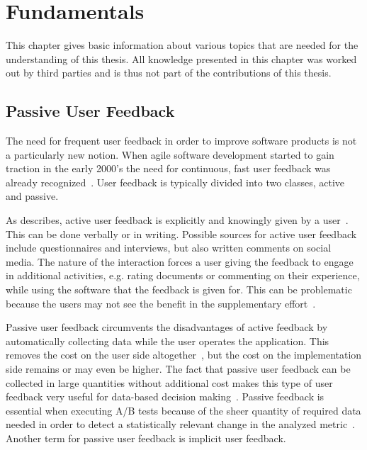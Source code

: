 %
\chapter{Fundamentals}
\label{ch:fundamentals}

This chapter gives basic information about various topics that are needed for the understanding of this thesis.
All knowledge presented in this chapter was worked out by third parties and is thus not part of the contributions of this thesis.

\section{Passive User Feedback}
\label{sec:fundamentals:implicit}

The need for frequent user feedback in order to improve software products is not a particularly new notion.
When agile software development started to gain traction in the early 2000's the need for continuous, fast user feedback was already recognized~\cite{Williams2003}.
User feedback is typically divided into two classes, active and passive.

As \citeauthor{Bosch2012} describes, active user feedback is explicitly and knowingly given by a user~\cite{Bosch2012}.
This can be done verbally or in writing.
Possible sources for active user feedback include questionnaires and interviews, but also written comments on social media.
The nature of the interaction forces a user giving the feedback to engage in additional activities, e.g. rating documents or commenting on their experience, while using the software that the feedback is given for.
This can be problematic because the users may not see the benefit in the supplementary effort~\cite{Kelly:2003:IFI:959258.959260}.

Passive user feedback circumvents the disadvantages of active feedback by automatically collecting data while the user operates the application.
This removes the cost on the user side altogether~\cite{Kelly:2003:IFI:959258.959260}, but the cost on the implementation side remains or may even be higher.
The fact that passive user feedback can be collected in large quantities without additional cost makes this type of user feedback very useful for data-based decision making~\cite{Bosch2012}.
Passive feedback is essential when executing A/B tests because of the sheer quantity of required data needed in order to detect a statistically relevant change in the analyzed metric~\cite{Kohavi2009}.
Another term for passive user feedback is implicit user feedback.

